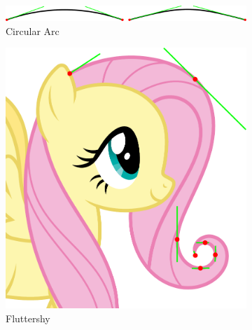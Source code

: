 \documentclass[a4paper]{article}
\begin{document}
				\begin{figure}[htb]
					\centering
					\begin{subfigure}[b]{\textwidth / 1}
						\includegraphics[width=\textwidth]{content/output/examples_bezier_arc.pdf}
						\caption{Circular Arc}
						\label{figure:examples_bézier_arc}
					\end{subfigure}
					\begin{subfigure}[b]{\textwidth / 2}
						\includegraphics[width=\textwidth]{content/output/examples_bezier_fluttershy.pdf}
						\caption{Fluttershy \cite{fluttershy}}
						\label{figure:examples_bézier_fluttershy}
					\end{subfigure}%
					\begin{subfigure}[b]{\textwidth / 2}

\end{subfigure}
\end{figure}
\end{document}
